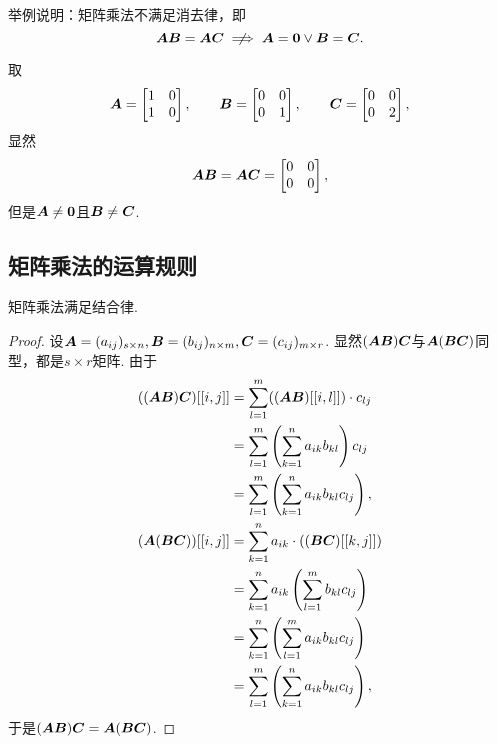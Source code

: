 \begin{example}
举例说明：矩阵乘法不满足消去律，即\[
	\vb{A} \vb{B} = \vb{A} \vb{C}
	\notimplies
	\vb{A} = \vb0 \lor \vb{B} = \vb{C}.
\]
\begin{solution}
取\[
	\boldsymbol{A} = \begin{bmatrix}
		1 & 0 \\
		1 & 0
	\end{bmatrix},
	\qquad
	\boldsymbol{B} = \begin{bmatrix}
		0 & 0 \\
		0 & 1
	\end{bmatrix},
	\qquad
	\boldsymbol{C} = \begin{bmatrix}
		0 & 0 \\
		0 & 2
	\end{bmatrix},
\]
显然\[
	\boldsymbol{A}\boldsymbol{B}
	= \boldsymbol{A}\boldsymbol{C}
	= \begin{bmatrix}
		0 & 0 \\
		0 & 0
	\end{bmatrix},
\]
但是\(\boldsymbol{A}\neq\boldsymbol0\)且\(\boldsymbol{B}\neq\boldsymbol{C}\).
\end{solution}
\end{example}

\subsection{矩阵乘法的运算规则}
\begin{theorem}
矩阵乘法满足结合律.
\begin{proof}
设\(\boldsymbol{A} = (a_{ij})_{s \times n},
\boldsymbol{B} = (b_{ij})_{n \times m},
\boldsymbol{C} = (c_{ij})_{m \times r}\).
显然\((\boldsymbol{A}\boldsymbol{B})\boldsymbol{C}\)与\(\boldsymbol{A}(\boldsymbol{B}\boldsymbol{C})\)同型，都是\(s \times r\)矩阵.
由于\begin{align*}
	((\boldsymbol{A}\boldsymbol{B})\boldsymbol{C})[[i,j]]
	&= \sum_{l=1}^m ((\boldsymbol{A}\boldsymbol{B})[[i,l]]) \cdot c_{lj} \\
	&= \sum_{l=1}^m \left( \sum_{k=1}^n a_{ik} b_{kl} \right) c_{lj} \\
	&= \sum_{l=1}^m \left( \sum_{k=1}^n a_{ik} b_{kl} c_{lj} \right), \\
	(\boldsymbol{A}(\boldsymbol{B}\boldsymbol{C}))[[i,j]]
	&= \sum_{k=1}^n a_{ik} \cdot ((\boldsymbol{B}\boldsymbol{C})[[k,j]]) \\
	&= \sum_{k=1}^n a_{ik} \left( \sum_{l=1}^m b_{kl} c_{lj} \right) \\
	&= \sum_{k=1}^n \left( \sum_{l=1}^m a_{ik} b_{kl} c_{lj} \right) \\
	&= \sum_{l=1}^m \left( \sum_{k=1}^n a_{ik} b_{kl} c_{lj} \right),
\end{align*}
于是\((\boldsymbol{A}\boldsymbol{B})\boldsymbol{C} = \boldsymbol{A}(\boldsymbol{B}\boldsymbol{C})\).
\end{proof}
\end{theorem}

